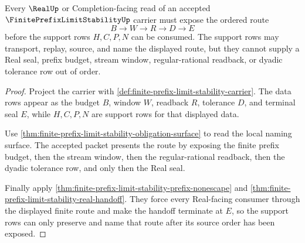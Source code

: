 \begin{theorem}
\label{thm:finite-prefix-limit-stability-source-lock}
Every $\RealUp$ or Completion-facing read of an accepted $\FinitePrefixLimitStabilityUp$ carrier must expose the ordered route
$$
B \to W \to R \to D \to E
$$
before the support rows $H,C,P,N$ can be consumed. The support rows may transport, replay, source, and name the displayed route, but they cannot supply a Real seal, prefix budget, stream window, regular-rational readback, or dyadic tolerance row out of order.
\end{theorem}
\begin{proof}
Project the carrier with \autoref{def:finite-prefix-limit-stability-carrier}. The data rows appear as the budget $B$, window $W$, readback $R$, tolerance $D$, and terminal seal $E$, while $H,C,P,N$ are support rows for that displayed data.

Use \autoref{thm:finite-prefix-limit-stability-obligation-surface} to read the local naming surface. The accepted packet presents the route by exposing the finite prefix budget, then the stream window, then the regular-rational readback, then the dyadic tolerance row, and only then the Real seal.

Finally apply \autoref{thm:finite-prefix-limit-stability-prefix-nonescape} and \autoref{thm:finite-prefix-limit-stability-real-handoff}. They force every Real-facing consumer through the displayed finite route and make the handoff terminate at $E$, so the support rows can only preserve and name that route after its source order has been exposed.
\end{proof}

